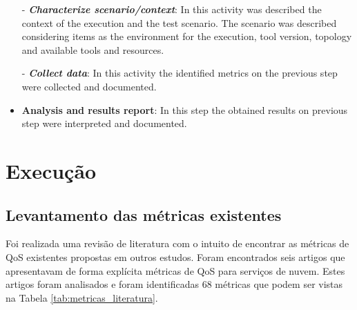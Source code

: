 \documentclass[conference]{IEEEtran}
\begin{document}
\begin{itemize}

  \subitem - \emph{\textbf{Characterize scenario/context}}: In this activity was described the context of the execution and the test scenario. The scenario was described considering items as the environment for
  the execution, tool version, topology and available tools and resources.

  \subitem - \emph{\textbf{Collect data}}: In this activity the identified metrics on 
  the previous step were collected and documented.

 \item \textbf{Analysis and results report}: In this step the obtained results on previous step were
 interpreted and documented.
 
\end{itemize}

\section{Execução} %

  \subsection{Levantamento das métricas existentes}
      
      Foi realizada uma revisão de literatura com o intuito de encontrar as métricas de QoS existentes
      propostas em outros estudos. Foram encontrados seis artigos que apresentavam de forma explícita métricas de QoS para
      serviços de nuvem.  Estes artigos foram analisados e foram identificadas 68 métricas que podem ser vistas na Tabela \ref{tab:metricas_literatura}.
      
\end{document}
